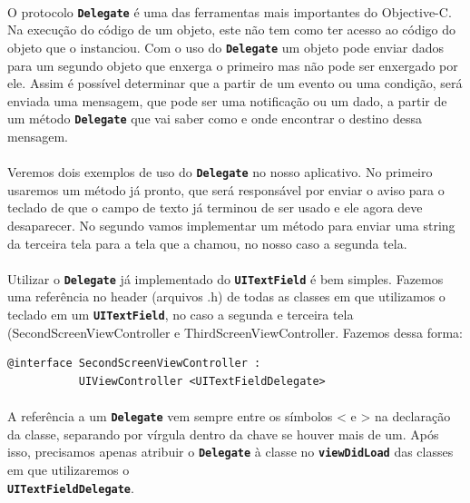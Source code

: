 \documentclass[a4paper,12pt,brazil,doubleside]{book}
\begin{document}
\paragraph{}O protocolo \texttt{\textbf{Delegate}} é uma das ferramentas mais importantes do Objective-C. Na execução do código de um objeto, este não tem como ter acesso ao código do objeto que o instanciou. Com o uso do \texttt{\textbf{Delegate}} um objeto pode enviar dados para um segundo objeto que enxerga o primeiro mas não pode ser enxergado por ele. Assim é possível determinar que a partir de um evento ou uma condição, será enviada uma mensagem, que pode ser uma notificação ou um dado, a partir de um método \texttt{\textbf{Delegate}} que vai saber como e onde encontrar o destino dessa mensagem.
\paragraph{}Veremos dois exemplos de uso do \texttt{\textbf{Delegate}} no nosso aplicativo. No primeiro usaremos um método já pronto, que será responsável por enviar o aviso para o teclado de que o campo de texto já terminou de ser usado e ele agora deve desaparecer. No segundo vamos implementar um método para enviar uma string da terceira tela para a tela que a chamou, no nosso caso a segunda tela.

\paragraph{}Utilizar o \texttt{\textbf{Delegate}} já implementado do \texttt{\textbf{UITextField}} é bem simples. Fazemos uma referência no header (arquivos .h) de todas as classes em que utilizamos o teclado em um \texttt{\textbf{UITextField}}, no caso a segunda e terceira tela (SecondScreenViewController e ThirdScreenViewController. Fazemos dessa forma:

\begin{listing}
\begin{verbatim}
@interface SecondScreenViewController :
           UIViewController <UITextFieldDelegate>
\end{verbatim}
\end{listing}

\paragraph{}A referência a um \texttt{\textbf{Delegate}} vem sempre entre os símbolos < e > na declaração da classe, separando por vírgula dentro da chave se houver mais de um. Após isso, precisamos apenas atribuir o \texttt{\textbf{Delegate}} à classe no \texttt{\textbf{viewDidLoad}} das classes em que utilizaremos o\\ \texttt{\textbf{UITextFieldDelegate}}.
\end{document}
